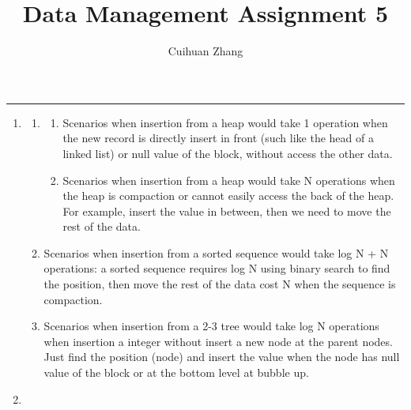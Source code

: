 \documentclass[12pt]{extarticle}
\title{Data Management Assignment 5}
\author{Cuihuan Zhang}
\begin{document}
\maketitle \vspace{-10mm}
\rule{\linewidth}{0.4pt}


\begin{flushleft}
\begin{enumerate}

\item

\begin{enumerate}

\item

\begin{enumerate}
\item Scenarios when insertion from a heap would take 1 operation when the new record is directly insert in front (such like the head of a linked list) or null value of the block, without access the other data.
\item Scenarios when insertion from a heap would take N operations when the heap is compaction or cannot easily access the back of the heap. For example, insert the value in between, then we need to move the rest of the data.
\end{enumerate}

\item Scenarios when insertion from a sorted sequence would take log N + N operations: a sorted sequence requires log N using binary search to find the position, then move the rest of the data cost N when the sequence is compaction.

\item Scenarios when insertion from a 2-3 tree would take log N operations when insertion a integer without insert a new node at the parent nodes. Just find the position (node) and insert the value when the node has null value of the block or at the bottom level at bubble up.
\end{enumerate}

\item
\begin{enumerate}


\end{enumerate}
\end{enumerate}
\end{flushleft}
\end{document}
